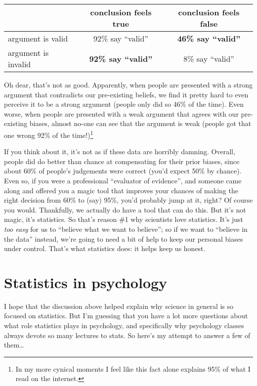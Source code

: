 \documentclass[]{book}
\let\rmarkdownfootnote\footnote%
\def\footnote{\protect\rmarkdownfootnote}
\begin{document}
\begin{longtable}[]{@{}lcc@{}}
\toprule
& conclusion feels true & conclusion feels false\tabularnewline
\midrule
\endhead
argument is valid & 92\% say ``valid'' & \textbf{46\% say ``valid''}\tabularnewline
argument is invalid & \textbf{92\% say ``valid''} & 8\% say ``valid''\tabularnewline
\bottomrule
\end{longtable}

Oh dear, that's not as good. Apparently, when people are presented with a strong argument that contradicts our pre-existing beliefs, we find it pretty hard to even perceive it to be a strong argument (people only did so 46\% of the time). Even worse, when people are presented with a weak argument that agrees with our pre-existing biases, almost no-one can see that the argument is weak (people got that one wrong 92\% of the time!)\footnote{In my more cynical moments I feel like this fact alone explains 95\% of what I read on the internet.}

If you think about it, it's not as if these data are horribly damning. Overall, people did do better than chance at compensating for their prior biases, since about 60\% of people's judgements were correct (you'd expect 50\% by chance). Even so, if you were a professional ``evaluator of evidence'', and someone came along and offered you a magic tool that improves your chances of making the right decision from 60\% to (say) 95\%, you'd probably jump at it, right? Of course you would. Thankfully, we actually do have a tool that can do this. But it's not magic, it's statistics. So that's reason \#1 why scientists love statistics. It's just \emph{too easy} for us to ``believe what we want to believe''; so if we want to ``believe in the data'' instead, we're going to need a bit of help to keep our personal biases under control. That's what statistics does: it helps keep us honest.

\hypertarget{statistics-in-psychology}{%
\section{Statistics in psychology}\label{statistics-in-psychology}}

I hope that the discussion above helped explain why science in general is so focused on statistics. But I'm guessing that you have a lot more questions about what role statistics plays in psychology, and specifically why psychology classes always devote so many lectures to stats. So here's my attempt to answer a few of them\ldots{}
\end{document}
